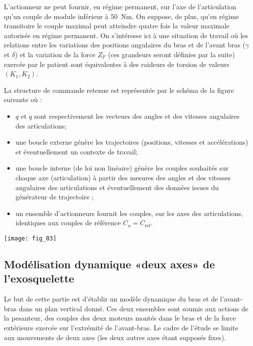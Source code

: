 \begin{multicols}{2}
\normalsize

L’actionneur ne peut fournir, en régime permanent, sur l’axe de l’articulation qu’un
couple de module inférieur à \SI{50}{Nm}. On suppose, de plus, qu’en régime transitoire le couple maximal peut
atteindre quatre fois la valeur maximale autorisée en régime permanent.
On s’intéresse ici à une situation de travail où les relations entre les variations des positions angulaires du
bras et de l’avant bras ($\gamma$ et $\delta$) et la variation de la force $Z_F$ (ces grandeurs seront définies par la suite) exercée par le patient sont équivalentes à des raideurs de torsion de valeurs $(K_1,K_2)$.

La structure de commande retenue est représentée par le schéma de la figure suivante où :
\begin{itemize}
\item $q$ et $\dot{q}$ sont respectivement les vecteurs des angles et des vitesses angulaires des articulations;
\item une boucle externe génère les trajectoires (positions, vitesses et accélérations) et éventuellement un contexte
de travail;
\item une boucle interne (de loi non linéaire) génère les couples souhaités sur chaque axe (articulation) à partir
des mesures des angles et des vitesses angulaires des articulations et éventuellement des données issues du
générateur de trajectoire ;
\item un ensemble d’actionneurs fournit les couples, sur les axes des articulations, identiques aux couples de
référence $C_a = C_{\text{ref}}$.
\end{itemize}

\begin{center}
\texttt{[image: fig\_03]}
\end{center}

\newpage


\subsection*{Modélisation dynamique «deux axes» de l’exosquelette}
\begin{obj}
Le but de cette partie est d’établir un modèle dynamique du bras et de l’avant-bras dans un plan vertical
donné. Ces deux ensembles sont soumis aux actions de la pesanteur, des couples des deux moteurs montés
dans le bras et de la force extérieure exercée sur l’extrémité de l’avant-bras. Le cadre de l’étude se limite
aux mouvements de deux axes (les deux autres axes étant supposés fixes).
\end{obj}


\end{multicols}
